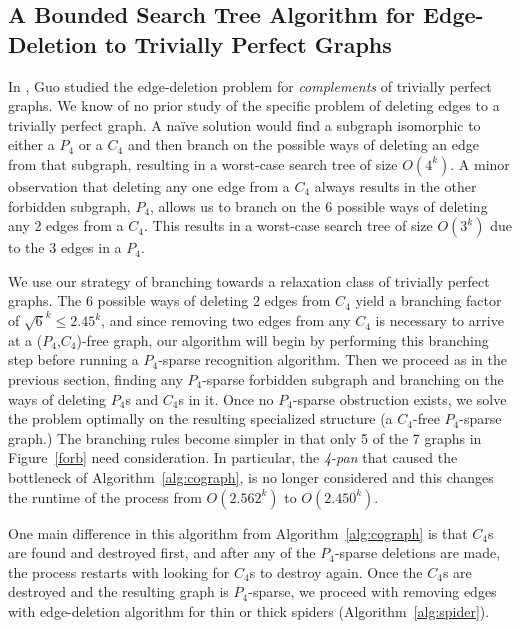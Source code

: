 \documentclass{llncs}
\begin{document}
\subsection{A Bounded Search Tree Algorithm for Edge-Deletion to Trivially Perfect Graphs}

In \cite{Guo}, Guo studied the edge-deletion problem for \emph{complements} of trivially perfect graphs. We know of no prior study of the specific problem of deleting edges to a trivially perfect graph. A na\"ive solution would find a subgraph isomorphic to either a $P_4$ or a $C_4$ and then branch on the possible ways of deleting an edge from that subgraph, resulting in a worst-case search tree of size $O(4^k)$. A minor observation that deleting any one edge from a $C_4$ always results in the other forbidden subgraph, $P_4$, allows us to branch on the 6 possible ways of deleting any 2 edges from a $C_4$. This results in a worst-case search tree of size $O(3^k)$ due to the 3 edges in a $P_4$.

We use our strategy of branching towards a relaxation class of trivially perfect graphs. The 6 possible ways of deleting 2 edges from $C_4$ yield a branching factor of $\sqrt{6}^k \leq 2.45^k$, and since removing two edges from any $C_4$ is necessary to arrive at a ($P_4$,$C_4$)-free graph, our algorithm will begin by performing this branching step before running a $P_4$-sparse recognition algorithm. Then we proceed as in the previous section, finding any $P_4$-sparse forbidden subgraph and branching on the ways of deleting $P_4$s and $C_4$s in it. Once no $P_4$-sparse obstruction exists, we solve the problem optimally on the resulting specialized structure (a $C_4$-free $P_4$-sparse graph.) The branching rules become simpler in that only 5 of the 7 graphs in Figure~\ref{forb} need consideration. In particular, the \emph{4-pan} that caused the bottleneck of Algorithm~\ref{alg:cograph}, is no longer considered and this changes the runtime of the process from $O(2.562^k)$ to $O(2.450^k)$.

One main difference in this algorithm from Algorithm~\ref{alg:cograph} is that $C_4$s are found and destroyed first, and after any of the $P_4$-sparse deletions are made, the process restarts with looking for $C_4$s to destroy again. Once the $C_4$s are destroyed and the resulting graph is $P_4$-sparse, we proceed with removing edges with edge-deletion algorithm for thin or thick spiders (Algorithm~\ref{alg:spider}).
\end{document}
